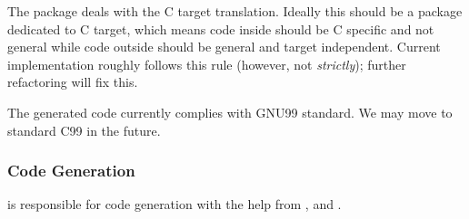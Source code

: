 \documentclass[12pt]{article}
\begin{document}
The  package deals with 
the C target translation. Ideally this should be a package 
dedicated to C target, which means code inside should be C specific 
and not general while code outside should be general and 
target independent. 
Current implementation roughly follows this rule 
(however, not \emph{strictly}); further refactoring will fix this. 

The generated code currently complies with GNU99 standard.  
We may move to standard C99 in the future. 

\subsubsection{Code Generation}

 is responsible for code generation
with the help from , 
and . 
\end{document}
